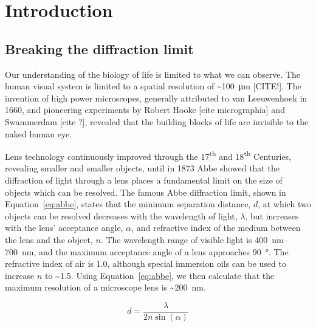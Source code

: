 
\chapter{Introduction}  %

\ifpdf
    \graphicspath{{Chapter1/Figs/Raster/}{Chapter1/Figs/PDF/}{Chapter1/Figs/}}
\else
    \graphicspath{{Chapter1/Figs/Vector/}{Chapter1/Figs/}}
\fi

\section{Breaking the diffraction limit}
Our understanding of the biology of life is limited to what we can observe. 
The human visual system is limited to a spatial resolution of \textasciitilde\SI{100}{\micro\metre} [CITE!]. %
The invention of high power microscopes, generally attributed to van Leeuwenhoek in 1660, and pioneering experiments by Robert Hooke [cite micrographia] and Swammerdam [cite ?], revealed that the building blocks of life are invisible to the naked human eye. 

Lens technology continuously improved through the 17\textsuperscript{th} and 18\textsuperscript{th} Centuries, revealing smaller and smaller objects, until in 1873 Abbe showed that the diffraction of light through a lens places a fundamental limit on the size of objects which can be resolved. The famous Abbe diffraction limit, shown in Equation~\ref{eq:abbe}, states that the minimum separation distance, $d$, at which two objects can be resolved decreases with the wavelength of light, $\lambda$, but increases with the lens' acceptance angle, $\alpha$, and refractive index of the medium between the lens and the object, $n$. The wavelength range of visible light is \SIrange[range-phrase=--]{400}{700}{\nano\metre}, and the maximum acceptance angle of a lens approaches \SI{90}{\degree}. The refractive index of air is $1.0$, although special immersion oils can be used to increase $n$ to \textasciitilde\num{1.5}. Using Equation~\ref{eq:abbe}, we then calculate that the maximum resolution of a microscope lens is \textasciitilde\SI{200}{\nano\metre}. 

\begin{equation} \label{eq:abbe}
d = \frac{\lambda}{2n\sin\left (\alpha  \right )}\end{equation}


